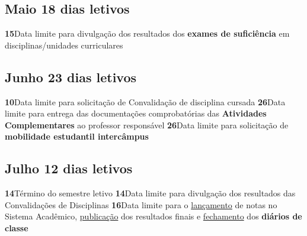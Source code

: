 \documentclass[thesis]{hmcposter}
\begin{document}
\begin{poster}
\subsection{Maio \hfill 18 dias letivos}\textbf{15}\qquad Data limite para divulgação dos resultados dos \textbf{exames de suficiência} em disciplinas/unidades curriculares \newline \null\subsection{Junho \hfill 23 dias letivos}\textbf{10}\qquad Data limite para solicitação de Convalidação de disciplina cursada \newline \null\textbf{26}\qquad Data limite para entrega das documentações comprobatórias das \textbf{Atividades Complementares} ao professor responsável \newline \null\textbf{26}\qquad Data limite para solicitação de \textbf{mobilidade estudantil intercâmpus} \newline \null\subsection{Julho \hfill 12 dias letivos}\textbf{14}\qquad Término do semestre letivo \newline \null\textbf{14}\qquad Data limite para divulgação dos resultados das Convalidações de Disciplinas \newline \null\textbf{16}\qquad Data limite para o \underline{lançamento} de notas no Sistema Acadêmico, \underline{publicação} dos resultados finais e \underline{fechamento} dos \textbf{diários de classe} \newline \null\newpage

\end{poster}
\end{document}
